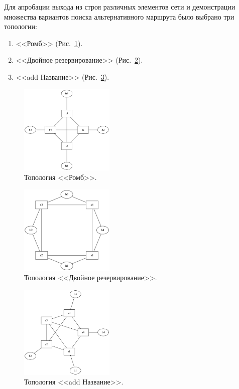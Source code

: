 \documentclass[12pt,fleqn]{article}
\begin{document}
Для апробации выхода из строя различных элементов сети и демонстрации множества вариантов поиска альтернативного маршрута было выбрано три топологии:
\begin{enumerate}
	\item <<Ромб>> (Рис.~\ref{pic:4node}).
	\item <<Двойное резервирование>> (Рис.~\ref{pic:double}).
	\item <<add Название>> (Рис.~\ref{pic:5node}).
\end{enumerate}

\begin{figure}[h!]
	\centering
	\includegraphics[width=0.40\textwidth]{img/4node.png}
	\caption{Топология <<Ромб>>.}
	\label{pic:4node}
\end{figure}

\begin{figure}[h!]
	\centering
	\includegraphics[width=0.40\textwidth]{img/double.png}
	\caption[russian]{Топология <<Двойное резервирование>>.}
	\label{pic:double}
\end{figure}

\begin{figure}[h!]
	\centering
	\includegraphics[width=0.40\textwidth]{img/5node.png}
	\caption{Топология <<add Название>>.}
	\label{pic:5node}
\end{figure}
\end{document}
